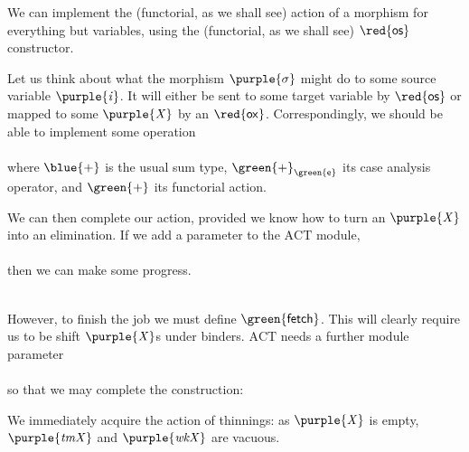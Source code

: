 \documentclass[natbib]{article}
\makeatletter
\newcommand{\anonymous}{\kern0.06em \vbox{\hrule\@width.5em}}
\def\resethooks{%
  \global\let\SaveRestoreHook\empty
  \global\let\ColumnHook\empty}
\let\hspre\empty
\let\hspost\empty
\newcommand{\D}[1]{\blue{\mathsf{#1}}}
\newcommand{\C}[1]{\red{\mathsf{#1}}}
\newcommand{\F}[1]{\green{\mathsf{#1}}}
\newcommand{\V}[1]{\purple{\mathit{#1}}}
\makeatother
\begin{document}
We can implement the (functorial, as we shall see) action of a
morphism for everything but variables, using the (functorial, as we
shall see) \ensuremath{\C{os}} constructor.

Let us think about what the morphism \ensuremath{\V{\sigma}} might do to some source variable \ensuremath{\V{i}}.
It will either be sent to some target variable by \ensuremath{\C{os}} or mapped to some \ensuremath{\V{X}} by an
\ensuremath{\C{ox}}. Correspondingly, we should be able to implement some operation \\
\usebox{\fetchTybox} \\
where \ensuremath{\D{+}} is the usual sum type, \ensuremath{\F{+}_{\F{e}}} its case analysis operator, and
\ensuremath{\F{+}} its functorial action.

\usebox{\plusbox}

We can then complete our action, provided we know how to turn an \ensuremath{\V{X}} into an
elimination. If we add a parameter to the \ensuremath{\mathrm{ACT}} module, \\
\usebox{\tmXbox} \\
then we can make some progress. \\
\usebox{\fetchedbox} \\
\usebox{\vabox}

However, to finish the job we must define \ensuremath{\F{fetch}}. This will clearly require us
to be shift \ensuremath{\V{X}}s under binders. \ensuremath{\mathrm{ACT}} needs a further module parameter\\
\usebox{\wkXbox}\\
so that we may complete the construction:\\
\usebox{\fetchbox}

We immediately acquire the action of thinnings: as \ensuremath{\V{X}} is empty, \ensuremath{\V{tmX}} and \ensuremath{\V{wkX}} are
vacuous.
\resethooks
\end{document}

